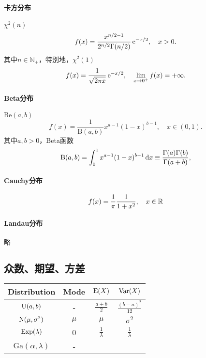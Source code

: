 \paragraph{卡方分布}

$\chi^2(n)$
\begin{equation}
	f(x)=\frac{x^{n/2-1}}{2^{n/2}\Gamma(n/2)}\mathop{}\!\mathrm{e}^{-x/2},\quad x>0.
\end{equation}
其中$n\in\mathbb N_+$，特别地，$\chi^2(1)$
\[
	f(x)=\frac1{\sqrt{2\pi x}}\mathop{}\!\mathrm{e}^{-x/2},\quad\lim_{x\to 0^+}f(x)=+\infty.
\]

\paragraph{Beta分布}

$\mathrm{Be}(a,b)$
\begin{equation}
	f(x)=\frac1{\mathrm B(a,b)}x^{a-1}(1-x)^{b-1},\quad x\in(0,1).
\end{equation}
其中$a,b>0$，Beta函数
\[
	\mathrm B(a,b)=\int_0^1x^{a-1}(1-x)^{b-1}\mathop{}\!\mathrm{d} x\equiv\frac{\Gamma(a)\Gamma(b)}{\Gamma(a+b)},
\]

\paragraph{Cauchy分布}

\begin{equation}
	f(x)=\frac1\pi\frac1{1+x^2},\quad x\in\mathbb R
\end{equation}

\paragraph{Landau分布}

略

\subsection{众数、期望、方差}

\begin{center}
	\begin{tabular}{cccc}
		\toprule
		Distribution&Mode&$\operatorname{E}(X)$&$\operatorname{Var}(X)$\\
		\midrule
		$\operatorname{U}(a,b)$&-&$\frac{a+b}2$&$\frac{(b-a)^2}{12}$\\
		$\operatorname{N}(\mu,\sigma^2)$&$\mu$&$\mu$&$\sigma^2$\\
		$\operatorname{Exp}(\lambda)$&0&$\frac1\lambda$&$\frac1\lambda$\\
		$\mathrm{Ga}(\alpha,\lambda)$&-&&\\
		\bottomrule
	\end{tabular}
\end{center}

